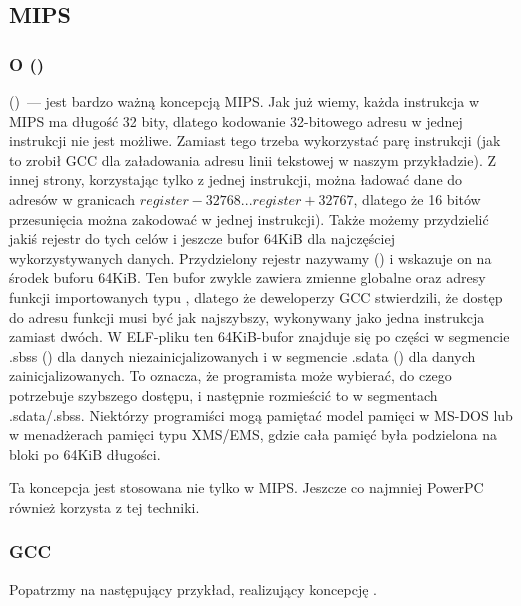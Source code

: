 \subsection{MIPS}

\subsubsection{O  ()}
\label{MIPS_GP}

 ()~--- jest bardzo ważną koncepcją MIPS.
Jak już wiemy, każda instrukcja w MIPS ma długość 32 bity, dlatego kodowanie 32-bitowego adresu w jednej instrukcji nie jest możliwe. Zamiast tego trzeba wykorzystać parę instrukcji
(jak to zrobił GCC dla załadowania adresu linii tekstowej w naszym przykładzie).
Z innej strony, korzystając tylko z jednej instrukcji, 
można ładować dane do adresów w granicach $register-32768...register+32767$, dlatego że 16 bitów
przesunięcia można zakodować w jednej instrukcji).
Także możemy przydzielić jakiś rejestr do tych celów i jeszcze bufor 64KiB dla najczęściej wykorzystywanych danych.
Przydzielony rejestr nazywamy  () i wskazuje on na środek buforu 64KiB.
Ten bufor zwykle zawiera zmienne globalne oraz adresy funkcji importowanych typu \printf,
dlatego że deweloperzy GCC stwierdzili, że dostęp do adresu funkcji musi być jak najszybszy,
wykonywany jako jedna instrukcja zamiast dwóch.
W ELF-pliku ten 64KiB-bufor znajduje się po części w segmencie .sbss () dla danych niezainicjalizowanych i w segmencie .sdata () dla danych zainicjalizowanych.
To oznacza, że programista może wybierać, do czego potrzebuje szybszego dostępu, i następnie rozmieścić to
w segmentach .sdata/.sbss.
Niektórzy  programiści mogą pamiętać model pamięci w MS-DOS  
lub w menadżerach pamięci typu XMS/EMS, gdzie cała pamięć była podzielona na bloki po 64KiB długości.

Ta koncepcja jest stosowana nie tylko w MIPS. Jeszcze co najmniej PowerPC również korzysta z tej techniki.

\subsubsection{\Optimizing GCC}

Popatrzmy na następujący przykład, realizujący koncepcję .

